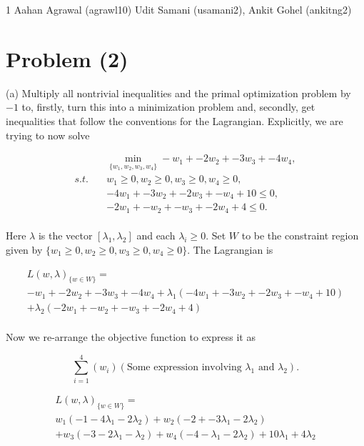 \documentclass[../main.tex]{subfiles}
\begin{document}
\homework
    {1}
    {Aahan Agrawal (agrawl10)}
    {Udit Samani (usamani2), Ankit Gohel (ankitng2)}

\section*{Problem (2)}

(a)
Multiply all nontrivial inequalities and the primal optimization problem by $-1$ to, firstly, turn this into a minimization problem and, secondly, get inequalities that follow the conventions for the Lagrangian. Explicitly, we are trying to now solve

	\begin{align*}
	&\min_{\{w_1, w_2, w_3, w_4\}} -w_1 + -2w_2 + -3w_3 +-4w_4, \\
	s.t.\quad & w_1 \geq 0, w_2 \geq 0, w_3 \geq 0, w_4 \geq 0, \\
	& -4w_1 + -3w_2 + -2w_3 + -w_4 + 10 \leq 0, \\
	& -2w_1 + -w_2 + -w_3 + -2w_4 + 4 \leq 0.
	\end{align*}
	\\


        Here $\lambda$ is the vector $[\lambda_1, \lambda_2]$ and each $\lambda_i \geq 0$. Set $W$ to be the constraint region given by $\{w_1 \geq 0, w_2 \geq 0, w_3 \geq 0, w_4 \geq 0\}$.
The Lagrangian is

\begin{multline*}
    L(w, \lambda)_{\{w \in W\}} = \\
    -w_1 + -2w_2 + -3w_3 + -4w_4  + \lambda_{1}(-4w_1 + -3w_2 + -2w_3 + -w_4 + 10) \\ + \lambda_{2}(-2w_1 + -w_2 + -w_3 + -2w_4 +4 )
\end{multline*} \\

Now we re-arrange the objective function to express it as 

\[\sum_{i=1}^{4}(w_{i})(\text{Some expression involving $\lambda_1$ and $\lambda_2$}).\]

\begin{multline*}
    L(w, \lambda)_{\{w \in W\}} = \\
    w_1(-1 - 4\lambda_1 -2\lambda_2) + w_2(-2 + -3\lambda_1 - 2\lambda_2) \\ + w_3(-3 - 2\lambda_1 - \lambda_{2}) + w_4(-4 - \lambda_{1} - 2\lambda_{2}) + 10\lambda_{1} + 4\lambda_{2}
\end{multline*} \\
\end{document}
